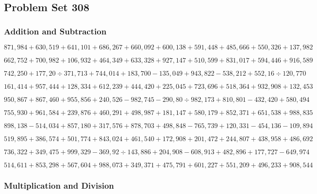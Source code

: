 \hypertarget{problem-set-308}{%
\subsection{Problem Set 308}\label{problem-set-308}}

\hypertarget{addition-and-subtraction}{%
\subsubsection{Addition and
Subtraction}\label{addition-and-subtraction}}

\(871,984+630,519+641,101+686,267+660,092+600,138+591,448+485,666+550,326+137,982\)

\(662,752+700,982+106,932+464,349+633,328+927,147+510,599+831,017+594,446+916,589\)

\(742,250+177,20÷371,713+744,014+183,700-135,049+943,822-538,212+552,16÷120,770\)

\(161,414+957,444+128,334+612,239+444,420+225,045+723,696+518,364+932,908+132,453\)

\(950,867+867,460+955,856+240,526-982,745-290,80÷982,173+810,801-432,420+580,494\)

\(755,930+961,584+239,876+460,291+498,987+181,147+580,179+852,371+651,538+988,835\)

\(898,138-514,034+857,180+317,576+878,703+498,848-765,739+120,331-454,136-109,894\)

\(519,895+386,574+501,774+843,024+461,540+172,908+201,472+244,807+438,958+486,692\)

\(736,322+349,475+999,329-369,92÷143,886+204,908-608,913+482,896+177,727-649,974\)

\(514,611+853,298+567,604+988,073+349,371+475,791+601,227+551,209+496,233+908,544\)

\hypertarget{multiplication-and-division}{%
\subsubsection{Multiplication and
Division}\label{multiplication-and-division}}

